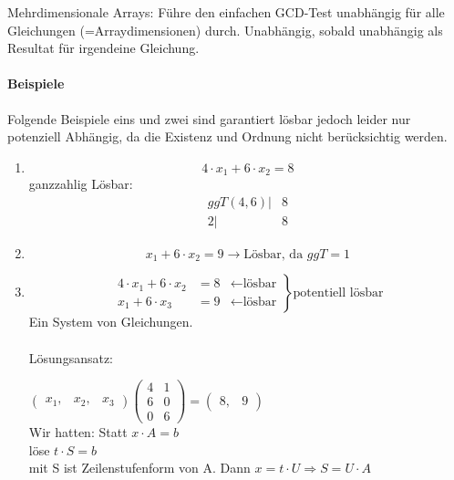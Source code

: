 \smallskip

Mehrdimensionale Arrays: Führe den einfachen GCD-Test unabhängig für
alle Gleichungen (=Arraydimensionen) durch. Unabhängig, sobald
unabhängig als Resultat für irgendeine Gleichung.

\paragraph{Beispiele}

Folgende Beispiele eins und zwei sind garantiert lösbar jedoch leider nur potenziell Abhängig, da die Existenz und Ordnung nicht berücksichtig werden.

\begin{enumerate}
  \item {
      \[4 \cdot x_1 + 6 \cdot x_2 = 8 \]
      ganzzahlig Lösbar: \\
      \begin{align*}
         ggT(4,6) |& 8\\
               2  |& 8
      \end{align*}
    }
  \item {\[x_1 + 6 \cdot x_2 = 9 \rightarrow \text{Lösbar, da } ggT = 1 \]}
  \item {
      \[ \left.
          \begin{split}
            4 \cdot x_1 + 6 \cdot x_2 &= 8 &\leftarrow \text{lösbar}\\
            x_1 + 6 \cdot x_3 &= 9 &\leftarrow \text{lösbar}
          \end{split}
       \right\rbrace{\text{potentiell lösbar}} \]
       Ein System von Gleichungen.\\
\\
       Lösungsansatz:

\( \begin{pmatrix}
    x_1 ,& x_2 ,& x_3
   \end{pmatrix}
   \begin{pmatrix}
     4 & 1\\
     6 & 0\\
     0 & 6
   \end{pmatrix}
=
   \begin{pmatrix}
     8 ,& 9
   \end{pmatrix}
\) \\
Wir hatten: Statt \(x \cdot A = b  \) \\
          löse \( t \cdot S = b \) \\
          mit S ist Zeilenstufenform von A.
          Dann \( x = t \cdot U \Rightarrow S = U \cdot A \)
        }

\end{enumerate}

